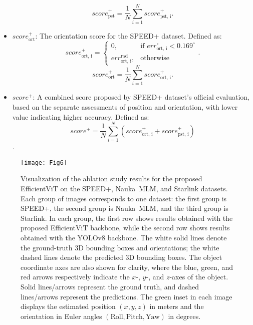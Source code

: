 \documentclass[a4paper,fleqn]{cas-sc}
\begin{document}
\begin{itemize}
	\begin{equation}
		score_{\text{pst}}^+ = \frac{1}{N}\sum\limits_{i=1}^N score_{\text{pst, i}}^+.
	\end{equation}
	
	\item $score_{\text{ort}}^+$: The orientation score for the SPEED+ dataset. Defined as:
	\begin{equation}
		score_{\text{ort, i}}^+ = 
		\begin{cases}
			0, & \text{if } err_{\text{ort, i}}^{\circ} < 0.169^\circ \\
			err_{\text{ort, i}}^{\text{rad}}, & \text{otherwise}
		\end{cases}.
	\end{equation}
	\begin{equation}
		score_{\text{ort}}^+ = \frac{1}{N}\sum\limits_{i=1}^N score_{\text{ort, i}}^+.
	\end{equation}
	\item $score^+$: A combined score proposed by SPEED+ dataset's official evaluation, based on the separate assessments of position and orientation, with lower value indicating higher accuracy. Defined as:
	\begin{equation}
		score^+ = \frac{1}{N}\sum\limits_{i=1}^N(score_{\text{ort, i}}^+ + score_{\text{pst, i}}^+)
	\end{equation}.
\end{itemize}

\begin{figure*}[!htbp]
	\centering
	\texttt{[image: Fig6]} 
\caption{Visualization of the ablation study results for the proposed EfficientViT on the SPEED+, Nauka~MLM, and Starlink datasets. 
    Each group of images corresponds to one dataset: the first group is SPEED+, the second group is Nauka~MLM, and the third group is Starlink. 
    In each group, the first row shows results obtained with the proposed EfficientViT backbone, while the second row shows results obtained with the YOLOv8 backbone. 
    The white solid lines denote the ground-truth 3D bounding boxes and orientations; the white dashed lines denote the predicted 3D bounding boxes. 
    The object coordinate axes are also shown for clarity, where the blue, green, and red arrows respectively indicate the $x$-, $y$-, and $z$-axes of the object. 
    Solid lines/arrows represent the ground truth, and dashed lines/arrows represent the predictions. 
    The green inset in each image displays the estimated position $(x,y,z)$ in meters and the orientation in Euler angles $(\mathrm{Roll}, \mathrm{Pitch}, \mathrm{Yaw})$ in degrees.}
    \label{fig:effvit_ablation}
	\label{fig:backbone_abliation}
\end{figure*}
\end{document}
